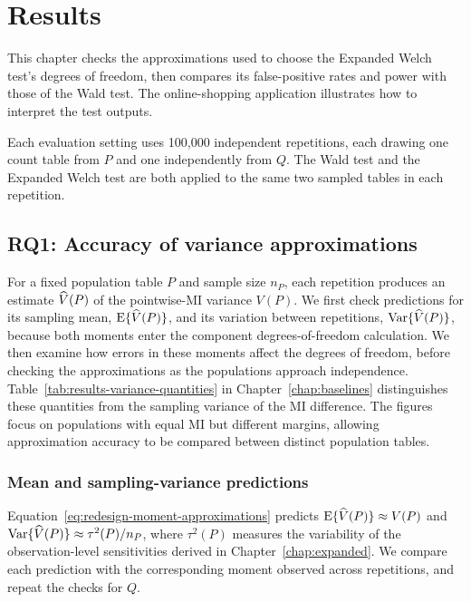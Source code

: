 \chapter{Results}
\label{chap:results}


This chapter checks the approximations used to choose the Expanded Welch test's
degrees of freedom, then compares its false-positive rates and power with
those of the Wald test. The online-shopping application illustrates how to interpret
the test outputs.

Each evaluation setting uses 100,000 independent repetitions, each drawing
one count table from \(P\) and one independently from \(Q\). The Wald test and the Expanded Welch test are both applied to the same two sampled tables in
each repetition.

\section{RQ1: Accuracy of variance approximations}

For a fixed population table \(P\) and sample size \(n_P\), each
repetition produces an estimate \(\widehat V(P)\) of the pointwise-MI variance
\(V(P)\). We first check predictions for its sampling mean,
\(\operatorname{E}\{\widehat V(P)\}\), and its variation between repetitions,
\(\operatorname{Var}\{\widehat V(P)\}\), because both moments enter the component
degrees-of-freedom calculation. We then examine how errors in these
moments affect the degrees of freedom, before checking the approximations
as the populations approach independence.
Table~\ref{tab:results-variance-quantities} in
Chapter~\ref{chap:baselines} distinguishes these quantities from the
sampling variance of the MI difference.
The figures focus on populations with equal MI but different margins,
allowing approximation accuracy to be compared between distinct population
tables.

\subsection{Mean and sampling-variance predictions}

Equation~\eqref{eq:redesign-moment-approximations} predicts
\(\operatorname{E}\{\widehat V(P)\}\approx V(P)\) and
\(\operatorname{Var}\{\widehat V(P)\}\approx\tau^2(P)/n_P\), where \(\tau^2(P)\)
measures the variability of the observation-level sensitivities derived
in Chapter~\ref{chap:expanded}. We compare each prediction with the
corresponding moment observed across repetitions, and repeat the checks
for \(Q\).

